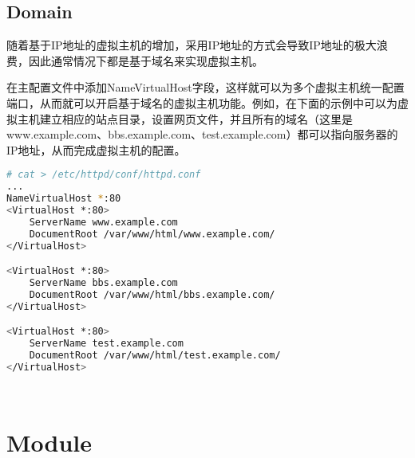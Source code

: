 \begin{lstlisting}[language=bash]

\end{lstlisting}





\begin{lstlisting}[language=bash]

\end{lstlisting}



\subsection{Domain}


随着基于IP地址的虚拟主机的增加，采用IP地址的方式会导致IP地址的极大浪费，因此通常情况下都是基于域名来实现虚拟主机。


在主配置文件中添加NameVirtualHost字段，这样就可以为多个虚拟主机统一配置端口，从而就可以开启基于域名的虚拟主机功能。例如，在下面的示例中可以为虚拟主机建立相应的站点目录，设置网页文件，并且所有的域名（这里是www.example.com、bbs.example.com、test.example.com）都可以指向服务器的IP地址，从而完成虚拟主机的配置。


\begin{lstlisting}[language=bash]
# cat > /etc/httpd/conf/httpd.conf
...
NameVirtualHost *:80
<VirtualHost *:80>
	ServerName www.example.com
	DocumentRoot /var/www/html/www.example.com/
</VirtualHost>

<VirtualHost *:80>
	ServerName bbs.example.com
	DocumentRoot /var/www/html/bbs.example.com/
</VirtualHost>

<VirtualHost *:80>
	ServerName test.example.com
	DocumentRoot /var/www/html/test.example.com/
</VirtualHost>
\end{lstlisting}




\begin{lstlisting}[language=bash]

\end{lstlisting}




\begin{lstlisting}[language=bash]

\end{lstlisting}


\section{Module}


